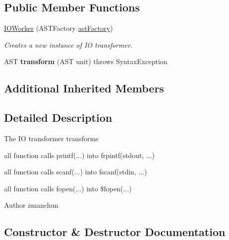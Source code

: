 \subsection*{Public Member Functions}
\begin{DoxyCompactItemize}
\item 
\hyperlink{classedu_1_1udel_1_1cis_1_1vsl_1_1civl_1_1transform_1_1common_1_1IOWorker_a68eabf211c95fd9daaa60bc0f77fde3a}{I\+O\+Worker} (A\+S\+T\+Factory \hyperlink{classedu_1_1udel_1_1cis_1_1vsl_1_1civl_1_1transform_1_1common_1_1BaseWorker_a44812bb476e4511fb6ca29a808427186}{ast\+Factory})
\begin{DoxyCompactList}\small\item\em Creates a new instance of I\+O transformer. \end{DoxyCompactList}\item 
\hypertarget{classedu_1_1udel_1_1cis_1_1vsl_1_1civl_1_1transform_1_1common_1_1IOWorker_afb935d9f6b41af5a735780bbdd9dfed0}{}A\+S\+T {\bfseries transform} (A\+S\+T unit)  throws Syntax\+Exception \label{classedu_1_1udel_1_1cis_1_1vsl_1_1civl_1_1transform_1_1common_1_1IOWorker_afb935d9f6b41af5a735780bbdd9dfed0}

\end{DoxyCompactItemize}
\subsection*{Additional Inherited Members}


\subsection{Detailed Description}
The I\+O transformer transforms~\newline
 


\begin{DoxyItemize}
\item all function calls printf(...) into frpintf(stdout, ...) 
\item all function calls scanf(...) into fscanf(stdin, ...) 
\item all function calls fopen(...) into \$fopen(...) 
\end{DoxyItemize}

\begin{DoxyAuthor}{Author}
zmanchun 
\end{DoxyAuthor}


\subsection{Constructor \& Destructor Documentation}
\hypertarget{classedu_1_1udel_1_1cis_1_1vsl_1_1civl_1_1transform_1_1common_1_1IOWorker_a68eabf211c95fd9daaa60bc0f77fde3a}{}
